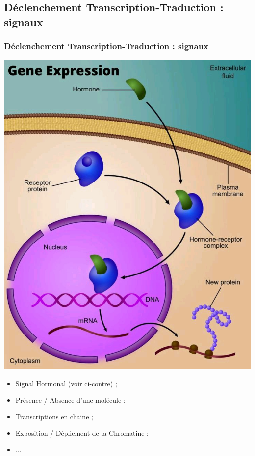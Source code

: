 \documentclass{beamer}
\begin{document}
\subsection{D{\'e}clenchement Transcription-Traduction : signaux}
\begin{frame}
	\frametitle{D{\'e}clenchement Transcription-Traduction : signaux}
	
	\begin{minipage}[ht]{0.50\linewidth}
		\includegraphics[height=0.75\textheight]{img/image_08de95ca-412b-41c3-af76-6b4fe29451ac20220620_124754.jpg}
	\end{minipage} \hfill \begin{minipage}[ht]{0.45\linewidth}
		\begin{itemize}
			\item Signal Hormonal (voir ci-contre) ; 
			\item Pr{\'e}sence / Absence d'une mol{\'e}cule ; 
			\item Transcriptions en chaine ; 
			\item Exposition / D{\'e}pliement de la Chromatine ; 
			\item ... 
		\end{itemize}
	\end{minipage} 
	
\end{frame}
\end{document}
